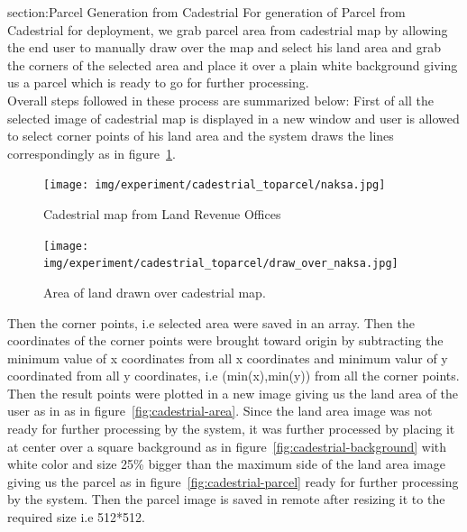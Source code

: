             \break 
        {section:Parcel Generation from Cadestrial}
        For generation of Parcel from Cadestrial for deployment, we grab parcel area from cadestrial map by allowing the end user to manually draw over the map and select his land area and grab the corners of the selected area and place it over a plain white background giving us a parcel which is ready to go for further processing.\\
        Overall steps followed in these process are summarized below:
        First of all the selected image of cadestrial map is displayed in a new window and user is allowed to select corner points of his land area and the system draws the lines correspondingly as in figure~\ref{fig:cadestrial-drawn}.
        \begin{figure}
            \centering
            \begin{minipage}{.45\textwidth}
                \centering
                \texttt{[image: img/experiment/cadestrial\_toparcel/naksa.jpg]}
                \caption{Cadestrial map from Land Revenue Offices}
                \label{fig:cadestrial-orginal}
                
            \end{minipage}%
            \hfill
            \begin{minipage}{.45\textwidth}
                \centering
                \texttt{[image: img/experiment/cadestrial\_toparcel/draw\_over\_naksa.jpg]}
                \caption{Area of land drawn over cadestrial map.}
                \label{fig:cadestrial-drawn}
            \end{minipage}
        \end{figure}
        Then the corner points, i.e selected area were saved in an array. Then the coordinates of the corner points were brought toward origin by subtracting the minimum value of x coordinates from all x coordinates and minimum valur of y coordinated from all y coordinates, i.e (min(x),min(y)) from all the corner points. Then the result points were plotted in a new image giving us the land area of the user as in as in figure~\ref{fig:cadestrial-area}. Since the land area image was not ready for further processing by the system, it was further processed by placing it at center over a square background as in figure~\ref{fig:cadestrial-background} with white color and size 25\% bigger than the maximum side of the land area image giving us the parcel as in figure~\ref{fig:cadestrial-parcel} ready for further processing by the system. Then the parcel image is saved in remote after resizing it to the required size i.e 512*512.
